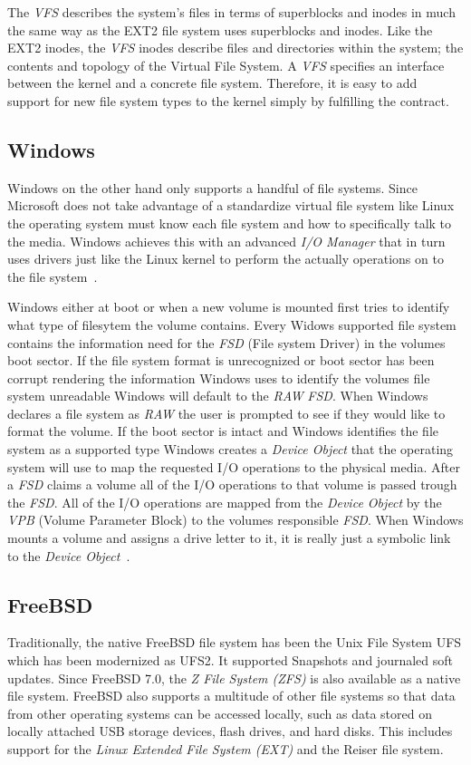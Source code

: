 \documentclass[10pt,draftclsnofoot,onecolumn,journal,compsoc]{IEEEtran}
\begin{document}
The \textit{VFS} describes the system's files in terms of superblocks and inodes in much the same way as the EXT2 file system uses superblocks and inodes. Like the EXT2 inodes, the \textit{VFS} inodes describe files and directories within the system; the contents and topology of the Virtual File System. A \textit{VFS} specifies an interface between the kernel and a concrete file system. Therefore, it is easy to add support for new file system types to the kernel simply by fulfilling the contract. 

\subsection*{Windows} 
Windows on the other hand only supports a handful of file systems. Since Microsoft does not take advantage of a standardize virtual file system like Linux the operating system must know each file system and how to specifically talk to the media. Windows achieves this with an advanced \textit{I/O Manager} that in turn uses drivers just like the Linux kernel to perform the actually operations on to the file system~\cite{Wini}. 

Windows either at boot or when a new volume is mounted first tries to identify what type of filesytem the volume contains. Every Widows supported file system contains the information need for the \textit{FSD} (File system Driver) in the volumes boot sector. If the file system format is unrecognized or boot sector has been corrupt rendering the information Windows uses to identify the volumes file system unreadable Windows will default to the \textit{RAW} \textit{FSD}. When Windows declares a file system as \textit{RAW} the user is prompted to see if they would like to format the volume. If the boot sector is intact and Windows identifies the file system as a supported type Windows creates a \textit{Device Object} that the operating system will use to map the requested I/O operations to the physical media. After a \textit{FSD} claims a volume all of the I/O operations to that volume is passed trough the \textit{FSD}. All of the I/O operations are mapped from the \textit{Device Object} by the \textit{VPB} (Volume Parameter Block) to the volumes responsible \textit{FSD}. When Windows mounts a volume and assigns a drive letter to it, it is really just a symbolic link to the \textit{Device Object}~\cite{Wini}.

\subsection*{FreeBSD}
Traditionally, the native FreeBSD file system has been the Unix File System UFS which has been modernized as UFS2. It supported Snapshots and journaled soft updates. Since FreeBSD 7.0, the \textit{Z File System (ZFS)} is also available as a native file system. FreeBSD also supports a multitude of other file systems so that data from other operating systems can be accessed locally, such as data stored on locally attached USB storage devices, flash drives, and hard disks. This includes support for the \textit{Linux Extended File System (EXT)} and the Reiser file system.
\end{document}
